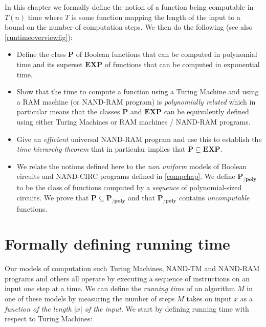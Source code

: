 In this chapter we formally define the notion of a function being
computable in \(T(n)\) time where \(T\) is some function mapping the
length of the input to a bound on the number of computation steps. We
then do the following (see also \cref{runtimeoverviewfig}):

\begin{itemize}
\item
  Define the class \(\mathbf{P}\) of Boolean functions that can be
  computed in polynomial time and its superset \(\mathbf{EXP}\) of
  functions that can be computed in exponential time.
\item
  Show that the time to compute a function using a Turing Machine and
  using a RAM machine (or NAND-RAM program) is \emph{polynomially
  related} which in particular means that the classes \(\mathbf{P}\) and
  \(\mathbf{EXP}\) can be equivalently defined using either Turing
  Machines or RAM machines / NAND-RAM programs.
\item
  Give an \emph{efficient} universal NAND-RAM program and use this to
  establish the \emph{time hierarchy theorem} that in particular implies
  that \(\mathbf{P} \subsetneq \mathbf{EXP}\).
\item
  We relate the notions defined here to the \emph{non uniform} models of
  Boolean circuits and NAND-CIRC programs defined in \cref{compchap}. We
  define \(\mathbf{P_{/poly}}\) to be the class of functions computed by
  a \emph{sequence} of polynomial-sized circuits. We prove that
  \(\mathbf{P} \subseteq \mathbf{P_{/poly}}\) and that
  \(\mathbf{P_{/poly}}\) contains \emph{uncomputable} functions.
\end{itemize}

\section{Formally defining running
time}\label{Formally-defining-running}

Our models of computation such Turing Machines, NAND-TM and NAND-RAM
programs and others all operate by executing a sequence of instructions
on an input one step at a time. We can define the \emph{running time} of
an algorithm \(M\) in one of these models by measuring the number of
steps \(M\) takes on input \(x\) as a \emph{function of the length
\(|x|\) of the input}. We start by defining running time with respect to
Turing Machines:

